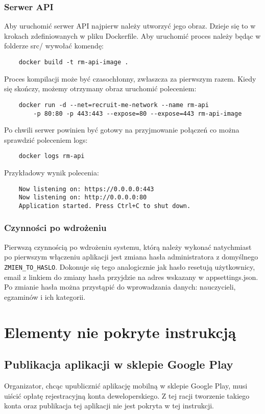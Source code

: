 \documentclass{article}
\begin{document}
\subsubsection{Serwer API}
Aby uruchomić serwer API najpierw należy utworzyć jego obraz. Dzieje się to w krokach zdefiniowanych w pliku Dockerfile. Aby uruchomić proces należy będąc w folderze src/ wywołać komendę:
\begin{verbatim}
    docker build -t rm-api-image .
\end{verbatim}
Proces kompilacji może być czasochłonny, zwłaszcza za pierwszym razem. Kiedy się skończy, możemy otrzymany obraz uruchomić poleceniem:
\begin{verbatim}
    docker run -d --net=recruit-me-network --name rm-api 
        -p 80:80 -p 443:443 --expose=80 --expose=443 rm-api-image
\end{verbatim}
Po chwili serwer powinien być gotowy na przyjmowanie połączeń co można sprawdzić poleceniem logs:
\begin{verbatim}
    docker logs rm-api
\end{verbatim}
Przykładowy wynik polecenia:
\begin{verbatim}
    Now listening on: https://0.0.0.0:443
    Now listening on: http://0.0.0.0:80
    Application started. Press Ctrl+C to shut down.
\end{verbatim}
\subsubsection{Czynności po wdrożeniu}
Pierwszą czynnością po wdrożeniu systemu, którą należy wykonać natychmiast po pierwszym włączeniu aplikacji jest zmiana hasła administratora z domyślnego \verb"ZMIEN_TO_HASLO". Dokonuje się tego analogicznie jak hasło resetują użytkownicy, email z linkiem do zmiany hasła przyjdzie na adres wskazany w appsettings.json. Po zmianie hasła można przystąpić do wprowadzania danych: nauczycieli, egzaminów i ich kategorii.
\section{Elementy nie pokryte instrukcją}
\subsection{Publikacja aplikacji w sklepie Google Play}
Organizator, chcąc upublicznić aplikację mobilną w sklepie Google Play, musi uiścić opłatę rejestracyjną konta deweloperskiego. Z tej racji tworzenie takiego konta oraz publikacja tej aplikacji nie jest pokryta w tej instrukcji.
\end{document}
